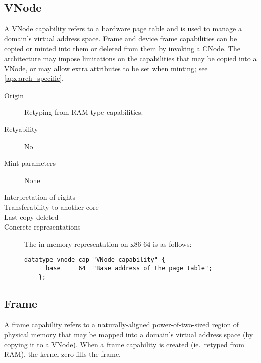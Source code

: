 \subsection{VNode}
A VNode capability refers to a hardware page table and is used to
manage a domain's virtual address space.  Frame and device frame
capabilities can be copied or minted into them or deleted from them by
invoking a CNode.  The architecture may impose limitations on the
capabilities that may be copied into a VNode, or may allow extra
attributes to be set when minting; see \ref{apx:arch_specific}.

\begin{description}
\item[Origin] Retyping from RAM type capabilities.

\item[Retyability] No

\item[Mint parameters] None
  
\item[Interpretation of rights] 
  
\item[Transferability to another core] 

\item[Last copy deleted] 
  
\item[Concrete representations] The in-memory representation on x86-64
  is as follows:
  
  \begin{lstlisting}[language=Mackerel]
    datatype vnode_cap "VNode capability" {
      base     64  "Base address of the page table";
    };
  \end{lstlisting}
\end{description}  

\subsection{Frame}
A frame capability refers to a naturally-aligned power-of-two-sized
region of physical memory that may be mapped into a domain's virtual
address space (by copying it to a VNode).  When a frame capability is
created (ie.~retyped from RAM), the kernel zero-fills the frame.

